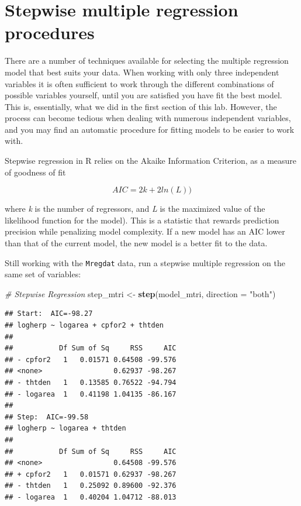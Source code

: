 \documentclass[
  12pt,
]{book}
\makeatletter
\newenvironment{Shaded}{\begin{snugshade}}{\end{snugshade}}
\newcommand{\CommentTok}[1]{\textcolor[rgb]{0.56,0.35,0.01}{\textit{#1}}}
\newcommand{\DataTypeTok}[1]{\textcolor[rgb]{0.13,0.29,0.53}{#1}}
\newcommand{\KeywordTok}[1]{\textcolor[rgb]{0.13,0.29,0.53}{\textbf{#1}}}
\newcommand{\NormalTok}[1]{#1}
\newcommand{\StringTok}[1]{\textcolor[rgb]{0.31,0.60,0.02}{#1}}
\newenvironment{kframe}{%
\medskip{}
\setlength{\fboxsep}{.8em}
\def\at@end@of@kframe{}%
\ifinner\ifhmode%
 \def\at@end@of@kframe{\end{minipage}}%
 \begin{minipage}{\columnwidth}%
\fi\fi%
\def\FrameCommand##1{\hskip\@totalleftmargin \hskip-\fboxsep
\colorbox{incolor}{##1}\hskip-\fboxsep
    \hskip-\linewidth \hskip-\@totalleftmargin \hskip\columnwidth}%
\MakeFramed {\advance\hsize-\width
  \@totalleftmargin\z@ \linewidth\hsize
  \@setminipage}}%
{\par\unskip\endMakeFramed%
\at@end@of@kframe}
\newenvironment{rmdblock}[1]
 {
 \begin{itemize}
 \renewcommand{\labelitemi}{
   \raisebox{-.7\height}[0pt][0pt]{
     {\setkeys{Gin}{width=3em,keepaspectratio}\texttt{[image: images/\#1]}}
   }
 }
 \begin{kframe}
 \setlength{\fboxsep}{1em}
 \item
 }
 {
 \end{kframe}
 \end{itemize}
 }
\newenvironment{rmdcode}
  {\begin{rmdblock}{screen}}
  {\end{rmdblock}}
\makeatother
\begin{document}
\hypertarget{stepwise-multiple-regression-procedures}{%
\section{Stepwise multiple regression procedures}\label{stepwise-multiple-regression-procedures}}

There are a number of techniques available for selecting the multiple regression model that best suits your data. When working with only three independent variables it is often sufficient to work through the different combinations of possible variables yourself, until you are satisfied you have fit the best model. This is, essentially, what we did in the first section of this lab. However, the process can become tedious when dealing with numerous independent variables, and you may find an automatic procedure for fitting models to be easier to work with.

Stepwise regression in R relies on the Akaike Information Criterion, as a measure of goodness of fit

\[AIC = 2k + 2ln(L))\]

where \emph{k} is the number of regressors, and \emph{L} is the maximized value of the likelihood function for the model). This is a statistic that rewards prediction precision while penalizing model complexity. If a new model has an AIC lower than that of the current model, the new model is a better fit to the data.

\begin{rmdcode}
Still working with the \texttt{Mregdat} data, run a stepwise multiple regression on the same set of variables:
\end{rmdcode}

\begin{Shaded}
\begin{Highlighting}[]
\CommentTok{\# Stepwise Regression}
\NormalTok{step\_mtri \textless{}{-}}\StringTok{ }\KeywordTok{step}\NormalTok{(model\_mtri, }\DataTypeTok{direction =} \StringTok{"both"}\NormalTok{)}
\end{Highlighting}
\end{Shaded}

\begin{verbatim}
## Start:  AIC=-98.27
## logherp ~ logarea + cpfor2 + thtden
## 
##           Df Sum of Sq     RSS     AIC
## - cpfor2   1   0.01571 0.64508 -99.576
## <none>                 0.62937 -98.267
## - thtden   1   0.13585 0.76522 -94.794
## - logarea  1   0.41198 1.04135 -86.167
## 
## Step:  AIC=-99.58
## logherp ~ logarea + thtden
## 
##           Df Sum of Sq     RSS     AIC
## <none>                 0.64508 -99.576
## + cpfor2   1   0.01571 0.62937 -98.267
## - thtden   1   0.25092 0.89600 -92.376
## - logarea  1   0.40204 1.04712 -88.013
\end{verbatim}
\end{document}
